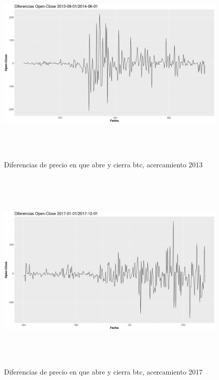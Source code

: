 \documentclass[12pt,letterpaper]{article}
\begin{document}
    \begin{figure}
        \centering

        \includegraphics[width = 18cm, height = 10cm]{btc/diferencias_BTC_OpenClose_1}

        \caption{Diferencias de precio en que abre y cierra btc, acercamiento 2013} 
    \end{figure}

    \begin{figure}
        \centering

        \includegraphics[width = 18cm, height = 10cm]{btc/diferencias_BTC_OpenClose_2}

        \caption{Diferencias de precio en que abre y cierra btc, acercamiento 2017}
    \end{figure}
\end{document}
